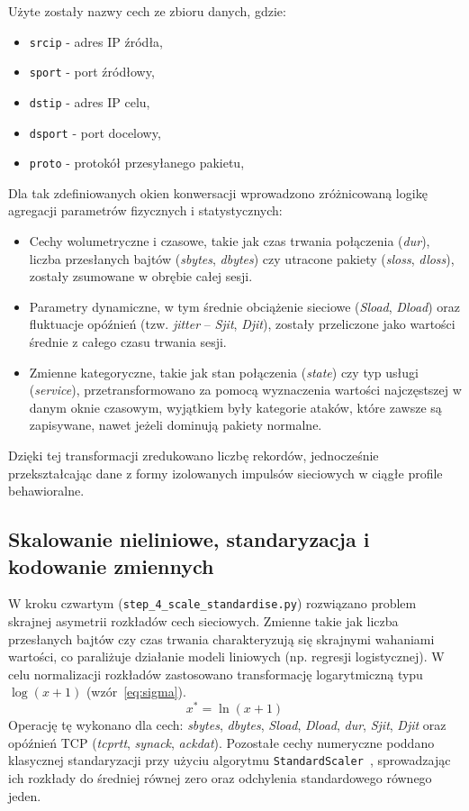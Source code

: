 \documentclass[12pt,twoside]{article}
\begin{document}
Użyte zostały nazwy cech ze zbioru danych, gdzie:
\begin{itemize}
\item \texttt{srcip} - adres IP źródła,
\item \texttt{sport} - port źródłowy,
\item \texttt{dstip} - adres IP celu,
\item \texttt{dsport} - port docelowy,
\item \texttt{proto} - protokół przesyłanego pakietu,
\end{itemize}

Dla tak zdefiniowanych okien konwersacji wprowadzono zróżnicowaną logikę agregacji parametrów fizycznych i statystycznych:
\begin{itemize}
	\item Cechy wolumetryczne i czasowe, takie jak czas trwania połączenia (\emph{dur}), liczba przesłanych bajtów (\emph{sbytes}, \emph{dbytes}) czy utracone pakiety (\emph{sloss}, \emph{dloss}), zostały zsumowane w obrębie całej sesji.
	\item Parametry dynamiczne, w tym średnie obciążenie sieciowe (\emph{Sload}, \emph{Dload}) oraz fluktuacje opóźnień (tzw. \emph{jitter} -- \emph{Sjit}, \emph{Djit}), zostały przeliczone jako wartości średnie z całego czasu trwania sesji.
	\item Zmienne kategoryczne, takie jak stan połączenia (\emph{state}) czy typ usługi (\emph{service}), przetransformowano za pomocą wyznaczenia wartości najczęstszej w danym oknie czasowym, wyjątkiem były kategorie ataków, które zawsze są zapisywane, nawet jeżeli dominują pakiety normalne.
\end{itemize}
Dzięki tej transformacji zredukowano liczbę rekordów, jednocześnie przekształcając dane z formy izolowanych impulsów sieciowych w ciągłe profile behawioralne.

\subsection{Skalowanie nieliniowe, standaryzacja i kodowanie zmiennych}

W kroku czwartym (\texttt{step\_4\_scale\_standardise.py}) rozwiązano problem skrajnej asymetrii rozkładów cech sieciowych. 
Zmienne takie jak liczba przesłanych bajtów czy czas trwania charakteryzują się skrajnymi wahaniami wartości, co paraliżuje działanie modeli liniowych (np. regresji logistycznej).
W celu normalizacji rozkładów zastosowano transformację logarytmiczną typu $\log(x + 1)$ (wzór~\ref{eq:sigma}).
\begin{equation}
\label{eq:sigma}
	x^* = \ln(x + 1)
\end{equation}
Operację tę wykonano dla cech: \emph{sbytes}, \emph{dbytes}, \emph{Sload}, \emph{Dload}, \emph{dur}, \emph{Sjit}, \emph{Djit} oraz opóźnień TCP (\emph{tcprtt}, \emph{synack}, \emph{ackdat}). 
Pozostałe cechy numeryczne poddano klasycznej standaryzacji przy użyciu algorytmu \texttt{StandardScaler}~\cite{bib:scaler}, sprowadzając ich rozkłady do średniej równej zero oraz odchylenia standardowego równego jeden.
\end{document}
